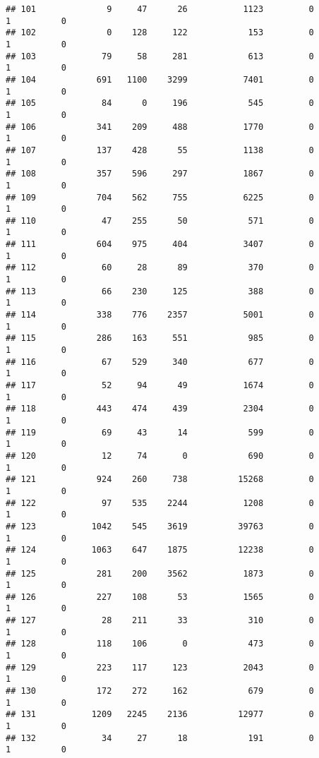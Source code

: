 \documentclass[
]{article}
\begin{document}
\begin{verbatim}
## 101              9     47      26           1123         0         1          0
## 102              0    128     122            153         0         1          0
## 103             79     58     281            613         0         1          0
## 104            691   1100    3299           7401         0         1          0
## 105             84      0     196            545         0         1          0
## 106            341    209     488           1770         0         1          0
## 107            137    428      55           1138         0         1          0
## 108            357    596     297           1867         0         1          0
## 109            704    562     755           6225         0         1          0
## 110             47    255      50            571         0         1          0
## 111            604    975     404           3407         0         1          0
## 112             60     28      89            370         0         1          0
## 113             66    230     125            388         0         1          0
## 114            338    776    2357           5001         0         1          0
## 115            286    163     551            985         0         1          0
## 116             67    529     340            677         0         1          0
## 117             52     94      49           1674         0         1          0
## 118            443    474     439           2304         0         1          0
## 119             69     43      14            599         0         1          0
## 120             12     74       0            690         0         1          0
## 121            924    260     738          15268         0         1          0
## 122             97    535    2244           1208         0         1          0
## 123           1042    545    3619          39763         0         1          0
## 124           1063    647    1875          12238         0         1          0
## 125            281    200    3562           1873         0         1          0
## 126            227    108      53           1565         0         1          0
## 127             28    211      33            310         0         1          0
## 128            118    106       0            473         0         1          0
## 129            223    117     123           2043         0         1          0
## 130            172    272     162            679         0         1          0
## 131           1209   2245    2136          12977         0         1          0
## 132             34     27      18            191         0         1          0

\end{verbatim}
\end{document}
